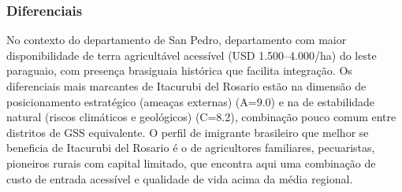 \subsubsection*{Diferenciais}\label{dif-itacurubi-del-rosario-0205}
No contexto do departamento de San Pedro, departamento com maior disponibilidade de terra agricultável acessível (USD 1.500–4.000/ha) do leste paraguaio, com presença brasiguaia histórica que facilita integração. Os diferenciais mais marcantes de Itacurubi del Rosario estão na dimensão de posicionamento estratégico (ameaças externas) (A=9.0) e na de estabilidade natural (riscos climáticos e geológicos) (C=8.2), combinação pouco comum entre distritos de GSS equivalente. O perfil de imigrante brasileiro que melhor se beneficia de Itacurubi del Rosario é o de agricultores familiares, pecuaristas, pioneiros rurais com capital limitado, que encontra aqui uma combinação de custo de entrada acessível e qualidade de vida acima da média regional.

